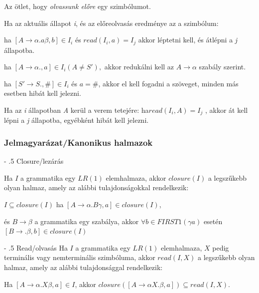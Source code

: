 \documentclass[margin=0px]{article}
\makeatletter
\renewcommand\paragraph{%
    \@startsection{paragraph}{4}{0mm}%
    {-\baselineskip}%
    {.5\baselineskip}%
    {\normalfont\normalsize\bfseries}}
\makeatother
\begin{document}
Az ötlet, hogy \textit{olvassunk előre} egy szimbólumot.

Ha az aktuális állapot \textit{i}, és az előreolvasás eredménye az a
szimbólum:

ha $ [A	\rightarrow \alpha.a\beta, b] \in I_i $ és $read(I_i, a) = I_j$
akkor léptetni kell, és átlépni a \textit{j} állapotba.


ha $ [A	\rightarrow \alpha., a] \in I_i (A \neq S'), $
akkor redukálni kell az $ A \rightarrow \alpha $ szabály szerint.




ha $ [S' \rightarrow S., \#] \in I_i $ és $ a = \# $, akkor el kell fogadni a szöveget,	minden más esetben hibát kell jelezni.

Ha az \textit{i} állapotban \textit{A} kerül a verem tetejére:
ha$  read(I_i,A) =	I_j $ ,
akkor át kell lépni a \textit{j} állapotba,	egyébként hibát kell jelezni.



\subsubsection{Jelmagyarázat/Kanonikus halmazok}

\paragraph{Closure/lezárás}

Ha $ I $ a grammatika egy $ LR(1) $ elemhalmaza, akkor $ closure(I) $ a
legszűkebb olyan halmaz, amely az alábbi tulajdonságokkal
rendelkezik:

$ I \subseteq closure(I) $ ha $ [A \rightarrow \alpha.B\gamma,a] \in closure(I) $,

és $ B \rightarrow \beta $ a grammatika egy szabálya,
akkor $ \forall b \in FIRST1(\gamma{}a) $ esetén $ [B \rightarrow .\beta,b] \in closure(I) $


\paragraph{Read/olvasás}
Ha $ I $ a grammatika egy $ LR(1) $ elemhalmaza, $ X $ pedig terminális	vagy nemterminális szimbóluma, akkor $ read(I, X) $ a legszűkebb olyan halmaz, amely az alábbi tulajdonsággal rendelkezik:

Ha $ [A \rightarrow \alpha. X\beta,a] \in I $, akkor $ closure([ A \rightarrow \alpha X.\beta,a]) \subseteq read(I, X) $.
\end{document}
